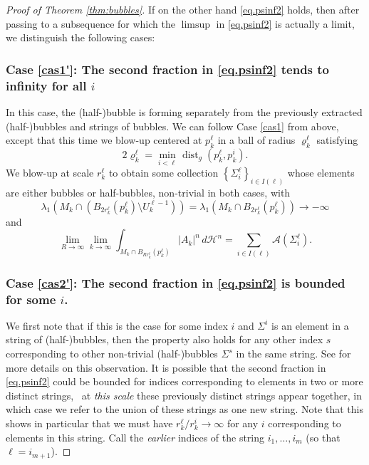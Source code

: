 \documentclass[JEP,XML,SOM,Unicode]{cedram}
\let\mathcal\mathscr
\newcounter{cas}
\renewcommand{\thecas}{\Roman{cas}}
\DeclareMathOperator{\dist}{dist}
\theoremstyle{definition}
\newcommand{\h}{\mathscr{H}}
\begin{document}
\begin{proof}[Proof of Theorem \ref{thm:bubbles}]
If on the other hand \eqref{eq.psinf2} holds, then after passing to a subsequence for which the $\limsup$ in \eqref{eq.psinf2} is actually a limit, we distinguish the following cases:

\renewcommand{\thecas}{\arabic{cas}$'$}
\subsubsection*{\label{cas1'}Case \ref{cas1'}: The second fraction in \eqref{eq.psinf2} tends to infinity for all $i$} In this case, the \hbox{(half-)}bubble is forming separately from the previously extracted (half-)bubbles and strings of bubbles. We can follow Case \ref{cas1} from above, except that this time we blow-up centered at $p^\ell_k$ in a ball of radius $\varrho^\ell_k$ satisfying
$$2\varrho^\ell_k = \min_{i<\ell} \dist_g(p^\ell_k, p^i_k).$$ We blow-up at scale $r^\ell_k$ to obtain some collection $\left\{\Sigma^\ell_i\right\}_{i\in I(\ell)}$ whose elements are either bubbles or half-bubbles, non-trivial in both cases, with
$$\lambda_1(M_k \cap (B_{2r^\ell_k}(p^\ell_k)\setminus U^{\ell-1}_k))=\lambda_1(M_k\cap B_{2r^\ell_k}(p^\ell_k))\to -\infty$$ and
\begin{equation}\label{eq.lthbubble1}
\lim_{R\to \infty} \lim_{k\to \infty} \int_{M_k\cap B_{Rr^\ell_k}(p^\ell_k)} |A_k|^n \,d\h^n = \sum_{i\in I(\ell)}\mathcal{A}(\Sigma^\ell_i).
\end{equation}

\subsubsection*{\label{cas2'}Case \ref{cas2'}: The second fraction in \eqref{eq.psinf2} is bounded for some $i$.} We first note that if this is the case for some index $i$ and $\Sigma^i$ is an element in a string of (half-)bubbles, then the property also holds for any other index $s$ corresponding to other non-trivial \hbox{(half-)}bubbles $\Sigma^s$ in the same string. See \cite[p.\,4389]{BS17} for more details on this observation. It is possible that the second fraction in \eqref{eq.psinf2} could be bounded for indices corresponding to elements in two or more distinct strings, \ie ~at \emph{this scale} these previously distinct strings appear together, in which case we refer to the union of these strings as one new string. Note that this shows in particular that we must have $r^\ell_k/r^i_k\to \infty$ for any $i$ corresponding to elements in this string. Call the \emph{earlier} indices of the string $i_1,\ldots,i_m$ (so that $\ell=i_{m+1}$).
\addtocounter{cas}{-2}%


\end{proof}
\end{document}
